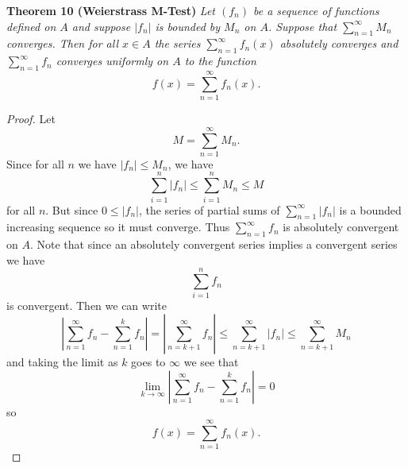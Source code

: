 \documentclass{article}
\begin{document}
\begin{flushleft}
\textbf{Theorem 10 (Weierstrass M-Test)}
\textsl{Let $(f_n)$ be a sequence of functions defined on $A$ and suppose $|f_n|$ is bounded by $M_n$ on $A$. Suppose that $\sum_{n=1}^{\infty} M_n$ converges. Then for all $x \in A$ the series $\sum_{n=1}^{\infty} f_n (x)$ absolutely converges and $\sum_{n=1}^{\infty} f_n$ converges uniformly on $A$ to the function
\[
f(x) = \sum_{n=1}^{\infty} f_n (x).
\]}
\begin{proof}
Let
\[
M = \sum_{n=1}^{\infty} M_n.
\]
Since for all $n$ we have $|f_n| \leq M_n$, we have
\[
\sum_{i=1}^n |f_n| \leq \sum_{i=1}^n M_n \leq M
\]
for all $n$. But since $0 \leq |f_n|$, the series of partial sums of $\sum_{n=1}^{\infty} |f_n|$ is a bounded increasing sequence so it must converge. Thus $\sum_{n=1}^{\infty} f_n$ is absolutely convergent on $A$. Note that since an absolutely convergent series implies a convergent series we have
\[
\sum_{i=1}^n f_n
\]
is convergent. Then we can write
\[
\left | \sum_{n=1}^{\infty} f_n - \sum_{n=1}^k f_n \right | = \left | \sum_{n=k+1}^{\infty} f_n \right | \leq \sum_{n=k+1}^{\infty} |f_n| \leq \sum_{n=k+1}^{\infty} M_n
\]
and taking the limit as $k$ goes to $\infty$ we see that
\[
\lim_{k \rightarrow \infty} \left | \sum_{n=1}^{\infty} f_n - \sum_{n=1}^k f_n \right | = 0
\]
so
\[
f(x) = \sum_{n=1}^{\infty} f_n (x).
\]
\end{proof}

\end{flushleft}
\end{document}
